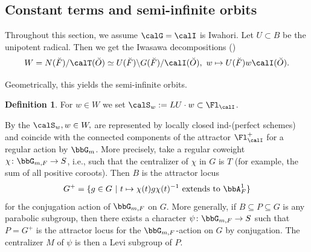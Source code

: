 \documentclass[10pt, reqno]{amsart}
\theoremstyle{plain}
\theoremstyle{definition}
\newtheorem{definition}[theorem]{Definition}
\numberwithin{equation}{section}
\begin{document}
	\subsection{Constant terms and semi-infinite orbits}
	\label{sec:semi-infinite-orbits}
	
	Throughout this section, we assume $\calG=\calI$ is Iwahori. Let $U\subset B$ be the unipotent radical. Then we get the Iwasawa decompositions (\cite[Theorem 5.3.3]{KP23})
	\begin{equation}
		\label{eq:1-iwasawa-decomposition-for-f-breve}
		W=N(\breve{F})/\calT(\breve{O}) \simeq U(\breve{F})\backslash G(\breve{F})/\calI(\breve{O}),\ w\mapsto U(\breve{F})w\calI(\breve{O}).
	\end{equation}
	
	Geometrically, this yields the semi-infinite orbits.
	
	\begin{definition}
		\label{sec:constant-terms-semi-definition-semi-infinite-orbit}
		For $w\in W$ we set $\calS_w:=LU\cdot w\subset \Fl_{\calI}$.
	\end{definition}
	
	By \cite[Section 5]{AGLR22} the $\calS_w, w\in W,$ are represented by locally closed ind-(perfect schemes) and coincide with the connected components of the attractor $\Fl_{\calI}^+$ for a regular action by $\bbG_m$. More precisely, take a regular coweight $\chi\colon \bbG_{m,F}\to S$, i.e., such that the centralizer of $\chi$ in $G$ is $T$ (for example, the sum of all positive coroots). Then $B$ is the attractor locus 
	\begin{equation}
		G^+=\{g\in G\ |\ t\mapsto \chi(t)g\chi(t)^{-1} \textrm{ extends to } \bbA^1_F\}
	\end{equation}
	for the conjugation action of $\bbG_{m,F}$ on $G$. More generally, if $B\subseteq P\subseteq G$ is any parabolic subgroup, then there exists a character $\psi\colon \bbG_{m,F}\to S$ such that $P=G^+$ is the attractor locus for the $\bbG_{m,F}$-action on $G$ by conjugation. The centralizer $M$ of $\psi$ is then a Levi subgroup of $P$.
	
\end{document}

